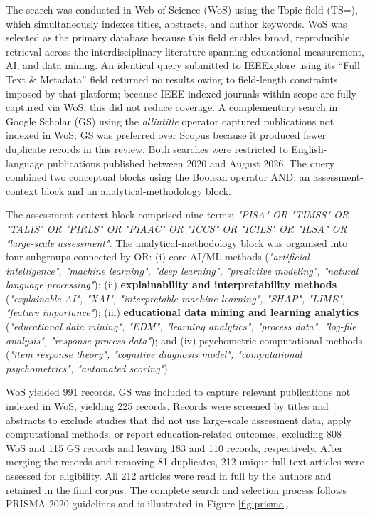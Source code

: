\documentclass{ieeeaccess}
\begin{document}
The search was conducted in Web of Science (WoS) using the Topic field (TS=), which simultaneously indexes titles, abstracts, and author keywords. WoS was selected as the primary database because this field enables broad, reproducible retrieval across the interdisciplinary literature spanning educational measurement, AI, and data mining. An identical query submitted to IEEExplore using its ``Full Text \& Metadata'' field returned no results owing to field-length constraints imposed by that platform; because IEEE-indexed journals within scope are fully captured via WoS, this did not reduce coverage. A complementary search in Google Scholar (GS) using the \textit{allintitle} operator captured publications not indexed in WoS; GS was preferred over Scopus because it produced fewer duplicate records in this review. Both searches were restricted to English-language publications published between 2020 and August 2026. The query combined two conceptual blocks using the Boolean operator AND: an assessment-context block and an analytical-methodology block.

The assessment-context block comprised nine terms: \textit{"PISA" OR "TIMSS" OR "TALIS" OR "PIRLS" OR "PIAAC" OR "ICCS" OR "ICILS" OR "ILSA" OR "large-scale assessment"}. The analytical-methodology block was organised into four subgroups connected by OR: (i) core AI/ML methods (\textit{"artificial intelligence", "machine learning", "deep learning", "predictive modeling", "natural language processing"}); (ii) \textbf{explainability and interpretability methods} (\textit{"explainable AI", "XAI", "interpretable machine learning", "SHAP", "LIME", "feature importance"}); (iii) \textbf{educational data mining and learning analytics} (\textit{"educational data mining", "EDM", "learning analytics", "process data", "log-file analysis", "response process data"}); and (iv) psychometric-computational methods (\textit{"item response theory", "cognitive diagnosis model", "computational psychometrics", "automated scoring"}).

WoS yielded 991 records. GS was included to capture relevant publications not indexed in WoS, yielding 225 records. Records were screened by titles and abstracts to exclude studies that did not use large-scale assessment data, apply computational methods, or report education-related outcomes, excluding 808 WoS and 115 GS records and leaving 183 and 110 records, respectively. After merging the records and removing 81 duplicates, 212 unique full-text articles were assessed for eligibility. All 212 articles were read in full by the authors and retained in the final corpus. The complete search and selection process follows PRISMA 2020 guidelines \cite{page2021} and is illustrated in Figure \ref{fig:prisma}.
\end{document}
